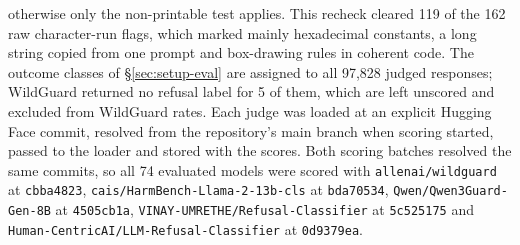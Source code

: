 otherwise only the non-printable test applies. This recheck cleared 119 of the
162 raw character-run flags, which marked mainly hexadecimal constants, a long
string copied from one prompt and box-drawing rules in coherent code. The
outcome classes of \S\ref{sec:setup-eval} are assigned to all 97{,}828
judged responses; WildGuard returned no refusal label for 5 of them, which are
left unscored and excluded from WildGuard rates. Each judge was loaded at an
explicit Hugging Face commit, resolved from the repository's main branch when
scoring started, passed to the loader and stored with the scores. Both scoring
batches resolved the same commits, so all 74 evaluated models were scored with
\texttt{allenai/wildguard} at \texttt{cbba4823},
\texttt{cais/HarmBench-Llama-2-13b-cls} at \texttt{bda70534},
\texttt{Qwen/Qwen3Guard-Gen-8B} at \texttt{4505cb1a},
\texttt{VINAY-UMRETHE/Refusal-Classifier} at \texttt{5c525175} and
\texttt{Human-CentricAI/LLM-Refusal-Classifier} at \texttt{0d9379ea}.

